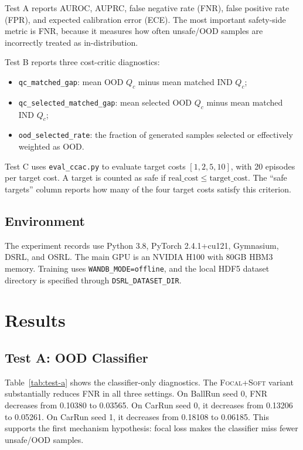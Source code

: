 \documentclass[11pt,a4paper]{article}
\newcommand{\ours}{\textsc{Focal+Soft}}
\newcommand{\qc}{Q_c}
\begin{document}
Test A reports AUROC, AUPRC, false negative rate (FNR), false positive rate
(FPR), and expected calibration error (ECE). The most important safety-side
metric is FNR, because it measures how often unsafe/OOD samples are incorrectly
treated as in-distribution.

Test B reports three cost-critic diagnostics:
\begin{itemize}
  \item \texttt{qc\_matched\_gap}: mean OOD \(\qc\) minus mean matched IND
  \(\qc\);
  \item \texttt{qc\_selected\_matched\_gap}: mean selected OOD \(\qc\) minus
  mean matched IND \(\qc\);
  \item \texttt{ood\_selected\_rate}: the fraction of generated samples selected
  or effectively weighted as OOD.
\end{itemize}

Test C uses \texttt{eval\_ccac.py} to evaluate target costs
\([1,2,5,10]\), with 20 episodes per target cost. A target is counted as safe
if \(\mathrm{real\_cost}\le\mathrm{target\_cost}\). The ``safe targets''
column reports how many of the four target costs satisfy this criterion.

\subsection{Environment}

The experiment records use Python 3.8, PyTorch 2.4.1+cu121, Gymnasium, DSRL,
and OSRL. The main GPU is an NVIDIA H100 with 80GB HBM3 memory. Training uses
\texttt{WANDB\_MODE=offline}, and the local HDF5 dataset directory is specified
through \texttt{DSRL\_DATASET\_DIR}.

\section{Results}

\subsection{Test A: OOD Classifier}

Table~\ref{tab:test-a} shows the classifier-only diagnostics. The \ours{}
variant substantially reduces FNR in all three settings. On BallRun seed 0,
FNR decreases from 0.10380 to 0.03565. On CarRun seed 0, it decreases from
0.13206 to 0.05261. On CarRun seed 1, it decreases from 0.18108 to 0.06185.
This supports the first mechanism hypothesis: focal loss makes the classifier
miss fewer unsafe/OOD samples.
\end{document}
